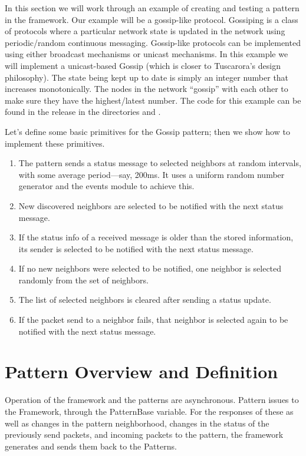 
In this section we will work through an example of creating and
testing a pattern in the framework.  Our example will be a gossip-like
protocol.  Gossiping is a class of protocols where a particular network
state is updated in the network using periodic/random continuous
messaging.  Gossip-like protocols can be implemented using either
broadcast mechanisms or unicast mechanisms.  In this
example we will implement a unicast-based Gossip (which is
closer to Tuscarora's design philosophy). The state being kept
up to date is simply an integer number that increases monotonically.
The nodes in the network ``gossip'' with each other to make sure they
have the highest/latest number. The code for this example can be
found in the release in the directories
 and .


Let's define some basic primitives for the Gossip pattern; 
then we show how to implement these primitives. 


\begin{enumerate}
\item  The pattern sends a status message to selected neighbors at
  random intervals, with some average period---say, 200ms. It uses a
  uniform random number generator and the events module to achieve
  this.  

\item New discovered neighbors are selected to be notified with the
  next status message.

\item If the status info of a received message is older than the
  stored information, its sender is selected to be notified with the
  next status message.

\item  If no new neighbors were selected to be notified, one neighbor
  is selected randomly from the set of neighbors.

\item The list of selected neighbors is cleared after sending a status
  update.

\item If the packet send to a neighbor fails, that neighbor is
  selected again to be notified with the next status message.
\end{enumerate}

\section{Pattern Overview and Definition} \label{sec:PatternCreation}
Operation of the framework and the patterns are asynchronous.
Pattern issues  to the Framework, through the PatternBase  variable. 
For the responses of these  as well as 
changes in the pattern neighborhood, 
changes in the status of the previously send packets, and
incoming packets to the pattern,
the framework generates  and sends them back to the Patterns. 

